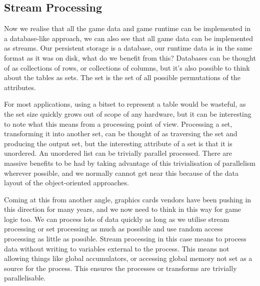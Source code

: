 \documentclass[a4paper,12pt]{article}
\begin{document}
\subsection{Stream Processing}

Now we realise that all the game data and game runtime can be implemented in a database-like approach, we can also see that all game data can be implemented as streams. Our persistent storage is a database, our runtime data is in the same format as it was on disk, what do we benefit from this? Databases can be thought of as collections of rows, or collections of columns, but it's also possible to think about the tables as sets. The set is the set of all possible permutations of the attributes.

For most applications, using a bitset to represent a table would be wasteful, as the set size quickly grows out of scope of any hardware, but it can be interesting to note what this means from a processing point of view. Processing a set, transforming it into another set, can be thought of as traversing the set and producing the output set, but the interesting attribute of a set is that it is unordered. An unordered list can be trivially parallel processed. There are massive benefits to be had by taking advantage of this trivialisation of parallelism wherever possible, and we normally cannot get near this because of the data layout of the object-oriented approaches.

Coming at this from another angle, graphics cards vendors have been pushing in this direction for many years, and we now need to think in this way for game logic too. We can process lots of data quickly as long as we utilise stream processing or set processing as much as possible and use random access processing as little as possible. Stream processing in this case means to process data without writing to variables external to the process. This means not allowing things like global accumulators, or accessing global memory not set as a source for the process. This ensures the processes or transforms are trivially parallelisable.
\end{document}
